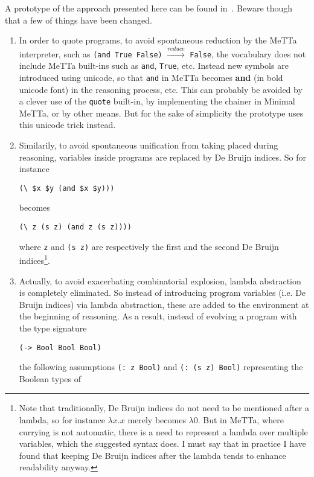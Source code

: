 \documentclass[]{report}
\begin{document}
A prototype of the approach presented here can be found
in~\cite{EvoReason}.  Beware though that a few of things have been
changed.
\begin{enumerate}
\item In order to quote programs, to avoid spontaneous reduction by
  the MeTTa interpreter, such as \texttt{(and True False)}
  $\xrightarrow{reduce}$ \texttt{False}, the vocabulary
  does not include MeTTa built-ins such as \texttt{and},
  \texttt{True}, etc.  Instead new symbols are introduced
  using unicode, so that \texttt{and} in MeTTa becomes
  \textbf{and} (in bold unicode font) in the reasoning process, etc.
  This can probably be avoided by a clever use of the
  \texttt{quote} built-in, by implementing the chainer in
  Minimal MeTTa, or by other means.  But for the sake of simplicity
  the prototype uses this unicode trick instead.
\item Similarily, to avoid spontaneous unification from taking placed
during reasoning, variables inside programs are replaced by De Bruijn
indices.  So for instance
\begin{verbatim}
(\ $x $y (and $x $y)))
\end{verbatim}
becomes
\begin{verbatim}
(\ z (s z) (and z (s z))))
\end{verbatim}
where \texttt{z} and \texttt{(s z)} are
respectively the first and the second De Bruijn indices\footnote{Note
that traditionally, De Bruijn indices do not need to be mentioned
after a lambda, so for instance $\lambda x.x$ merely becomes $\lambda
0$.  But in MeTTa, where currying is not automatic, there is a need to
represent a lambda over multiple variables, which the suggested syntax
does.  I must say that in practice I have found that keeping De Bruijn
indices after the lambda tends to enhance readability anyway.}.
\item Actually, to avoid exacerbating combinatorial explosion, lambda
  abstraction is completely eliminated.  So instead of introducing
  program variables (i.e. De Bruijn indices) via lambda abstraction,
  these are added to the environment at the beginning of reasoning.
  As a result, instead of evolving a program with the type signature
\begin{verbatim}
(-> Bool Bool Bool)
\end{verbatim}
the following assumptions \texttt{(: z Bool)} and
\texttt{(: (s z) Bool)} representing the Boolean types of

\end{enumerate}
\end{document}
